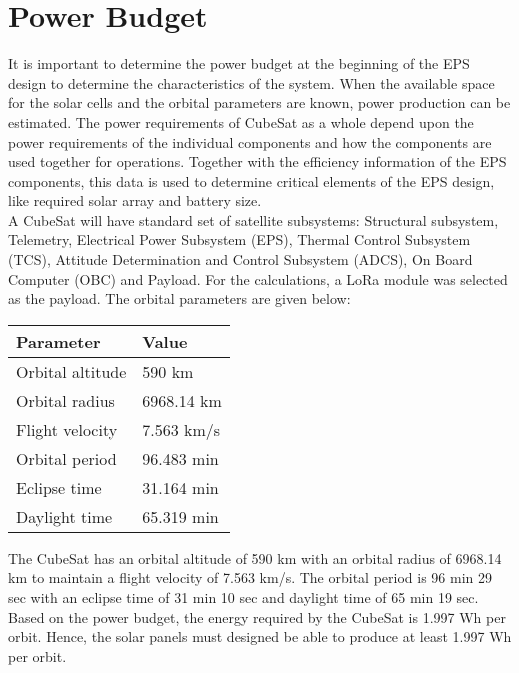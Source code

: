 \chapter{Power Budget}
\justifying
 It is important to determine the power budget at the beginning of the EPS design to determine the characteristics of the system. When the available space for the solar cells and the orbital parameters are known, power production can be estimated.
 The power requirements of CubeSat as a whole depend upon the power requirements of the individual components and how the components are used together for operations. Together with the efficiency information of the EPS components, this data is used to determine critical elements of the EPS design, like required solar array and battery size.
 \\
 A CubeSat will have standard set of satellite subsystems: Structural subsystem, Telemetry, Electrical Power Subsystem (EPS), Thermal Control Subsystem (TCS), Attitude Determination and Control Subsystem (ADCS), On Board Computer (OBC) and Payload. For the calculations, a LoRa module was selected as the payload. The orbital parameters are given below:
 
\begin{table}[]
	\begin{center}
	\begin{tabular}{|l|l|}
		\hline
		\textbf{Parameter} & \textbf{Value} \\ \hline
		Orbital altitude   & 590 km         \\ \hline
		Orbital radius     & 6968.14 km     \\ \hline
		Flight velocity    & 7.563 km/s     \\ \hline
		Orbital period     & 96.483 min     \\ \hline
		Eclipse time       & 31.164 min     \\ \hline
		Daylight time      & 65.319 min     \\ \hline
	\end{tabular}
\end{center}
\end{table}
 \pagebreak
The CubeSat has an orbital altitude of 590 km with an orbital radius of 6968.14 km to maintain a flight velocity of 7.563 km/s. The orbital period is 96 min 29 sec with an eclipse time of 31 min 10 sec and daylight time of 65 min 19 sec. Based on the power budget, the energy required by the CubeSat is 1.997 Wh per orbit. Hence, the solar panels must designed be able to produce at least 1.997 Wh per orbit.
 \\
 
